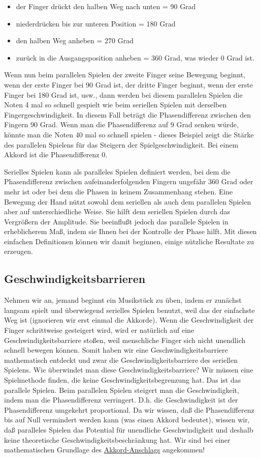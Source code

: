 \begin{itemize} 
 \item der Finger drückt den halben Weg nach unten = 90 Grad
 \item niederdrücken bis zur unteren Position = 180 Grad
 \item den halben Weg anheben = 270 Grad
 \item zurück in die Ausgangsposition anheben = 360 Grad, was wieder 0 Grad ist.
 \end{itemize}
Wenn nun beim parallelen Spielen der zweite Finger seine Bewegung beginnt, wenn der erste Finger bei 90 Grad ist, der dritte Finger beginnt, wenn der erste Finger bei 180 Grad ist, usw., dann werden bei diesem parallelen Spielen die Noten 4 mal so schnell gespielt wie beim seriellen Spielen mit derselben Fingergeschwindigkeit.
In diesem Fall beträgt die Phasendifferenz zwischen den Fingern 90 Grad.
Wenn man die Phasendifferenz auf 9 Grad senken würde, könnte man die Noten 40 mal so schnell spielen - dieses Beispiel zeigt die Stärke des parallelen Spielens für das Steigern der Spielgeschwindigkeit.
Bei einem Akkord ist die Phasendifferenz 0.

Serielles Spielen kann als paralleles Spielen definiert werden, bei dem die Phasendifferenz zwischen aufeinanderfolgenden Fingern ungefähr 360 Grad oder mehr ist oder bei dem die Phasen in keinem Zusammenhang stehen.
Eine Bewegung der Hand nützt sowohl dem seriellen als auch dem parallelen Spielen aber auf unterschiedliche Weise.
Sie hilft dem seriellen Spielen durch das Vergrößern der Amplitude.
Sie beeinflußt jedoch das parallele Spielen in erheblicherem Maß, indem sie Ihnen bei der Kontrolle der Phase hilft.
Mit diesen einfachen Definitionen können wir damit beginnen, einige nützliche Resultate zu erzeugen.


\subsection{Geschwindigkeitsbarrieren}\hypertarget{c1iv2b}{}

Nehmen wir an, jemand beginnt ein Musikstück zu üben, indem er zunächst langsam spielt und überwiegend serielles Spielen benutzt, weil das der einfachste Weg ist (ignorieren wir erst einmal die Akkorde).
Wenn die Geschwindigkeit der Finger schrittweise gesteigert wird, wird er natürlich auf eine Geschwindigkeitsbarriere stoßen, weil menschliche Finger sich nicht unendlich schnell bewegen können.
Somit haben wir eine Geschwindigkeitsbarriere mathematisch entdeckt und zwar die Geschwindigkeitsbarriere des seriellen Spielens.
Wie überwindet man diese Geschwindigkeitsbarriere?
Wir müssen eine Spielmethode finden, die keine Geschwindigkeitsbegrenzung hat.
Das ist das parallele Spielen.
Beim parallelen Spielen steigert man die Geschwindigkeit, indem man die Phasendifferenz verringert.
D.h. die Geschwindigkeit ist der Phasendifferenz umgekehrt proportional.
Da wir wissen, daß die Phasendifferenz bis auf Null vermindert werden kann (was einen Akkord bedeutet), wissen wir, daß paralleles Spielen das Potential für unendliche Geschwindigkeit und deshalb keine theoretische Geschwindigkeitsbeschränkung hat.
Wir sind bei einer mathematischen Grundlage des \hyperlink{c1ii9}{Akkord-Anschlags} angekommen!

